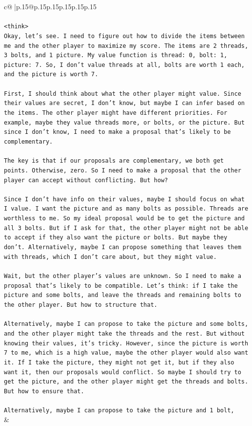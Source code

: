 \documentclass{article}
\begin{document}
{\begin{supertabular}{c@{$\;$}|p{.15\linewidth}@{}p{.15\linewidth}p{.15\linewidth}p{.15\linewidth}p{.15\linewidth}p{.15\linewidth}}
{{{\\ 
\\ 
\texttt{<think>} \\
\texttt{Okay, let's see. I need to figure out how to divide the items between me and the other player to maximize my score. The items are 2 threads, 3 bolts, and 1 picture. My value function is thread: 0, bolt: 1, picture: 7. So, I don't value threads at all, bolts are worth 1 each, and the picture is worth 7. } \\
\\ 
\texttt{First, I should think about what the other player might value. Since their values are secret, I don't know, but maybe I can infer based on the items. The other player might have different priorities. For example, maybe they value threads more, or bolts, or the picture. But since I don't know, I need to make a proposal that's likely to be complementary.} \\
\\ 
\texttt{The key is that if our proposals are complementary, we both get points. Otherwise, zero. So I need to make a proposal that the other player can accept without conflicting. But how?} \\
\\ 
\texttt{Since I don't have info on their values, maybe I should focus on what I value. I want the picture and as many bolts as possible. Threads are worthless to me. So my ideal proposal would be to get the picture and all 3 bolts. But if I ask for that, the other player might not be able to accept if they also want the picture or bolts. But maybe they don't. Alternatively, maybe I can propose something that leaves them with threads, which I don't care about, but they might value.} \\
\\ 
\texttt{Wait, but the other player's values are unknown. So I need to make a proposal that's likely to be compatible. Let's think: if I take the picture and some bolts, and leave the threads and remaining bolts to the other player. But how to structure that.} \\
\\ 
\texttt{Alternatively, maybe I can propose to take the picture and some bolts, and the other player might take the threads and the rest. But without knowing their values, it's tricky. However, since the picture is worth 7 to me, which is a high value, maybe the other player would also want it. If I take the picture, they might not get it, but if they also want it, then our proposals would conflict. So maybe I should try to get the picture, and the other player might get the threads and bolts. But how to ensure that.} \\
\\ 
\texttt{Alternatively, maybe I can propose to take the picture and 1 bolt,} \\
            }
        }
    }
    & \\ \\


\end{supertabular}}
\end{document}
